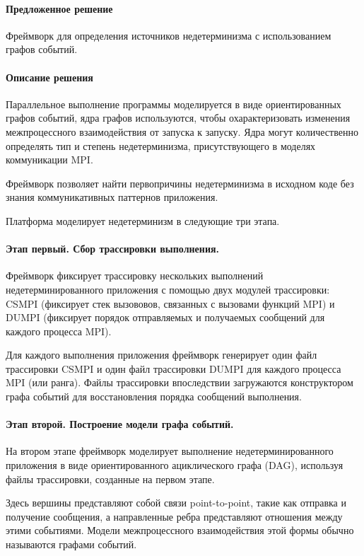 \paragraph{Предложенное решение}

Фреймворк для определения источников недетерминизма с использованием графов событий. 

\paragraph{Описание решения}

Параллельное выполнение программы моделируется в виде ориентированных графов событий, ядра графов используются, чтобы охарактеризовать изменения межпроцессного взаимодействия от запуска к запуску. Ядра могут количественно определять тип и степень недетерминизма, присутствующего в моделях коммуникации MPI.

Фреймворк позволяет найти первопричины недетерминизма в исходном коде без знания коммуникативных паттернов приложения.

Платформа моделирует недетерминизм в следующие три этапа. 

\paragraph{Этап первый. Сбор трассировки выполнения.} Фреймворк фиксирует трассировку нескольких выполнений недетерминированного приложения с помощью двух модулей трассировки: CSMPI (фиксирует стек вызововов, связанных с вызовами функций MPI) и DUMPI (фиксирует порядок отправляемых и получаемых сообщений для каждого процесса MPI).

Для каждого выполнения приложения фреймворк генерирует один файл трассировки CSMPI и один файл трассировки DUMPI для каждого процесса MPI (или ранга). Файлы трассировки впоследствии загружаются конструктором графа событий для восстановления порядка сообщений выполнения.

\paragraph{Этап второй. Построение модели графа событий.} На втором этапе фреймворк моделирует выполнение недетерминированного приложения в виде ориентированного ациклического графа (DAG), используя файлы трассировки, созданные на первом этапе.

Здесь вершины представляют собой связи point-to-point, такие как отправка и получение сообщения, а направленные ребра представляют отношения между этими событиями. Модели межпроцессного взаимодействия этой формы обычно называются графами событий.

